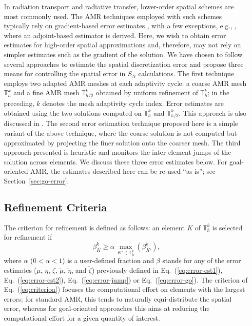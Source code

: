 \documentclass[preprint,10pt]{elsarticle}
\newcommand{\be}{\begin{equation}}
\newcommand{\ee}{\end{equation}}
\newcommand{\eqt}[1]{Eq.~(\ref{#1})}                     %
\renewcommand{\(}{\left(}
\renewcommand{\)}{\right)}
\renewcommand{\[}{\left[}
\renewcommand{\]}{\right]}
\begin{document}
In radiation transport and radiative transfer, lower-order spatial schemes are most commonly used. The AMR techniques employed with such schemes typically rely on gradient-based error estimates \cite{Jessee1998380}, with a few exceptions, e.g., \cite{kanschat-rad-transfer-97}, where an adjoint-based estimator is derived.
Here, we wish to obtain error estimates for high-order spatial approximations and, therefore, may not rely on simpler estimates such as the gradient of the solution. We have chosen to follow several approaches to estimate the spatial discretization error and propose three means for controlling the spatial error in $S_N$ calculations. The first technique employs two adapted AMR meshes at each adaptivity cycle: a coarse AMR mesh $\mathbb{T}_h^k$ and a fine AMR mesh $\mathbb{T}_{h/2}^k$ obtained by uniform refinement of $\mathbb{T}_h^k$; in the preceding, $k$ denotes the mesh adaptivity cycle index. Error estimates are obtained using the two solutions computed on $\mathbb{T}_{h}^k$ and $\mathbb{T}_{h/2}^k$. This approach is also discussed in \cite{demko-book1,Solin2004449}. The second error estimation technique proposed here is a simple variant of the above technique, where the coarse solution is not computed but approximated by projecting the finer solution onto the coarser mesh. The third approach presented is heuristic and monitors the inter-element jumps of the solution across elements. We discuss these three error estimates below. For goal-oriented AMR, the estimates 
described here can be re-used ``as is''; see Section~\ref{sec:go-error}.



\subsection{Refinement Criteria} \label{sec:error4}

The criterion for refinement is defined as follows: an element $K$ of $\mathbb{T}_h^k$ is selected for refinement if
\be
\beta _{K}^{k} \ge \alpha \, \max_{K'\in \mathbb{T}_{h}^k} \left( \beta _{K'}^{k} \right),
\label{eq:criterion}
\ee
where $\alpha$ ($0 < \alpha < 1$) is a user-defined fraction and $\beta$ stands for any of the error estimates ($\mu$, $\eta$, $\zeta$, $\widetilde \mu$, $\widetilde \eta$, and $\widetilde \zeta$)
previously defined in \eqt{eq:error-est1}, \eqt{eq:error-est2}, \eqt{eq:error-jump} or \eqt{eq:error-go}. 
The criterion of \eqt{eq:criterion} focuses the computational effort on elements with the largest errors; for
standard AMR, this tends to naturally equi-distribute the spatial error, whereas for goal-oriented approaches
this aims at reducing the computational effort for a given quantity of interest. 
\end{document}
